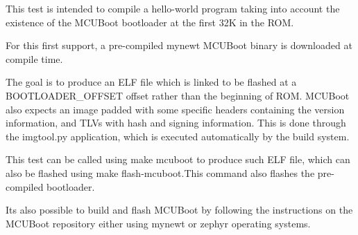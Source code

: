 This test is intended to compile a hello-\/world program taking into account the existence of the M\+C\+U\+Boot bootloader at the first 32K in the R\+OM.

For this first support, a pre-\/compiled mynewt M\+C\+U\+Boot binary is downloaded at compile time.

The goal is to produce an E\+LF file which is linked to be flashed at a {\ttfamily B\+O\+O\+T\+L\+O\+A\+D\+E\+R\+\_\+\+O\+F\+F\+S\+ET} offset rather than the beginning of R\+OM. M\+C\+U\+Boot also expects an image padded with some specific headers containing the version information, and T\+L\+Vs with hash and signing information. This is done through the imgtool.\+py application, which is executed automatically by the build system.

This test can be called using {\ttfamily make mcuboot} to produce such E\+LF file, which can also be flashed using {\ttfamily make flash-\/mcuboot}.This command also flashes the pre-\/compiled bootloader.

It\textquotesingle{}s also possible to build and flash M\+C\+U\+Boot by following the instructions on the M\+C\+U\+Boot repository either using mynewt or zephyr operating systems. 